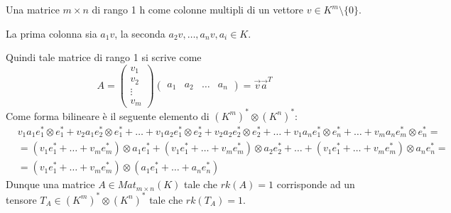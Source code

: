 \documentclass[../main.tex]{subfiles}
\begin{document}
Una matrice $m \times n$ di rango 1 h come colonne multipli di un vettore $v \in K^m \setminus \{0\}$.

La prima colonna sia $a_1v$, la seconda $a_2v, \ldots , a_nv, a_i \in K$.

Quindi tale matrice di rango 1 si scrive come
\begin{equation*}
    A = \begin{pmatrix}
        v_1    \\
        v_2    \\
        \vdots \\
        v_m
    \end{pmatrix}
    \begin{pmatrix}
        a_1 & a_2 & \ldots & a_n
    \end{pmatrix} = \overrightarrow{v} \overrightarrow{a}^T
\end{equation*}
Come forma bilineare è il seguente elemento di $(K^m)^* \otimes (K^n)^*$:
\begin{align*}
     & v_1 a_1 e_1^* \otimes e_1^* + v_2 a_1 e_2^* \otimes e_1^* + \ldots + v_1 a_2 e_1^* \otimes e_2^* + v_2 a_2 e_2^* \otimes e_2^* + \ldots + v_1 a_n e_1^* \otimes e_n^* + \ldots + v_m a_n e_m^* \otimes e_n^* = \\
     & = (v_1 e_1^* + \ldots + v_m e_m^*) \otimes a_1 e_1^* + (v_1 e_1^* + \ldots +v_m e_m^*) \otimes a_2 e_2^* + \ldots +(v_1 e_1^* + \ldots + v_m e_m^*) \otimes a_n e_n^* =                                        \\
     & = (v_1 e_1^* + \ldots + v_m e_m^*) \otimes (a_1 e_1^* + \ldots + a_n e_n^*)
\end{align*}
Dunque una matrice $A \in Mat_{m \times n} (K)$ tale che $rk(A) = 1$ corrisponde ad un tensore $T_A \in (K^m)^* \otimes (K^n)^*$ tale che $rk(T_A) = 1$.
\end{document}
